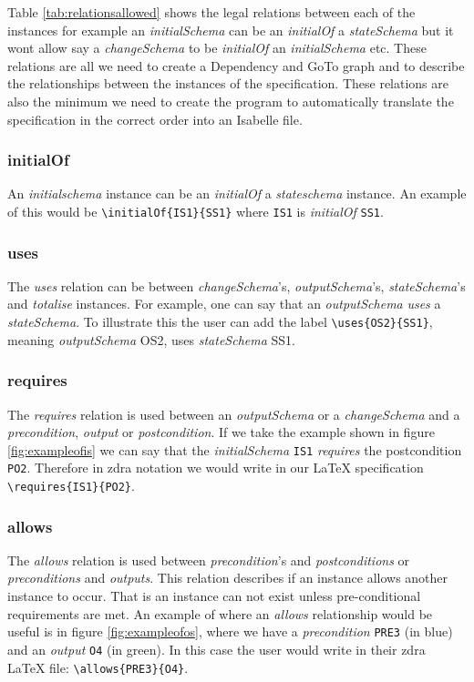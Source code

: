 Table \ref{tab:relationsallowed} shows the legal relations between each of the
instances for example an \emph{initialSchema} can be an \emph{initialOf} a
\emph{stateSchema} but it wont allow say a \emph{changeSchema} to be
\emph{initialOf} an \emph{initialSchema} etc. These relations are all we need to
create a Dependency and GoTo graph and to describe the relationships between the
instances of the specification. These relations are also the minimum we need to
create the program to automatically translate the specification in the correct
order into an Isabelle file.

\subsubsection{initialOf}

An \emph{initialschema} instance can be an \emph{initialOf} a \emph{stateschema}
instance. An example of this would be \verb|\initialOf{IS1}{SS1}| where
\verb|IS1| is \emph{initialOf} \verb|SS1|.

\subsubsection{uses}
The \emph{uses} relation can be between \emph{changeSchema}'s,
\emph{outputSchema}'s, \emph{stateSchema}'s and \emph{totalise} instances. For
example, one can say that an \emph{outputSchema} \emph{uses} a
\emph{stateSchema}. To illustrate this the user can add the label
\verb|\uses{OS2}{SS1}|, meaning \emph{outputSchema} OS2, uses \emph{stateSchema}
SS1.

\subsubsection{requires}
The \emph{requires} relation is used between an \emph{outputSchema} or a
\emph{changeSchema} and a \emph{precondition}, \emph{output} or
\emph{postcondition}. If we take the example shown in figure
\ref{fig:exampleofis} we can say that the \emph{initialSchema} \verb|IS1|
\emph{requires} the postcondition \verb|PO2|. Therefore in \gls{zdra} notation
we would write in our \LaTeX{} specification \verb|\requires{IS1}{PO2}|.

\subsubsection{allows}
The \emph{allows} relation is used between \emph{precondition}'s and
\emph{postconditions} or \emph{preconditions} and \emph{outputs}. This relation
describes if an instance allows another instance to occur. That is an instance
can not exist unless pre-conditional requirements are met. An example of where
an \emph{allows} relationship would be useful is in figure
\ref{fig:exampleofos}, where we have a \emph{precondition} \verb|PRE3| (in blue)
and an \emph{output} \verb|O4| (in green). In this case the user would write in
their \gls{zdra} \LaTeX{} file: \verb|\allows{PRE3}{O4}|.


